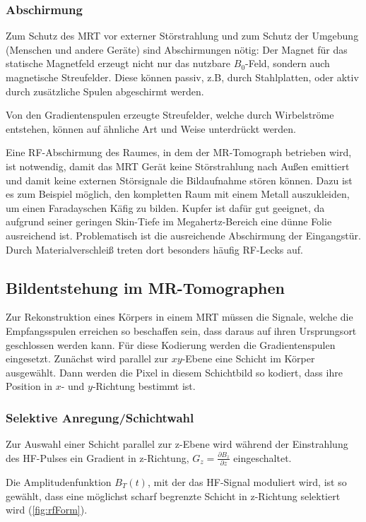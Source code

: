 \subsubsection{Abschirmung}
Zum Schutz des MRT vor externer Störstrahlung und zum Schutz der Umgebung (Menschen und andere Geräte) sind Abschirmungen nötig:
Der Magnet für das statische Magnetfeld erzeugt nicht nur das nutzbare $B_0$-Feld, sondern auch magnetische Streufelder. Diese können passiv, z.B, durch Stahlplatten, oder aktiv durch zusätzliche Spulen abgeschirmt werden.

Von den Gradientenspulen erzeugte Streufelder, welche durch Wirbelströme entstehen, können auf ähnliche Art und Weise unterdrückt werden.

Eine RF-Abschirmung des Raumes, in dem der MR-Tomograph betrieben wird, ist notwendig, damit das MRT Gerät keine Störstrahlung nach Außen emittiert und damit keine externen Störsignale die Bildaufnahme stören können.
Dazu ist es zum Beispiel möglich, den kompletten Raum mit einem Metall auszukleiden, um einen Faradayschen Käfig zu bilden. Kupfer ist dafür gut geeignet, da aufgrund seiner geringen Skin-Tiefe im Megahertz-Bereich eine dünne Folie ausreichend ist. \cite{Weibler1993} Problematisch ist die ausreichende Abschirmung der Eingangstür. Durch Materialverschleiß treten dort besonders häufig RF-Lecks auf.

\subsection{Bildentstehung im MR-Tomographen}
Zur Rekonstruktion eines Körpers in einem MRT müssen die Signale, welche die Empfangsspulen erreichen so beschaffen sein, dass daraus auf ihren Ursprungsort geschlossen werden kann. Für diese Kodierung werden die Gradientenspulen eingesetzt. Zunächst wird parallel zur $xy$-Ebene eine Schicht im Körper ausgewählt. Dann werden die Pixel in diesem Schichtbild so kodiert, dass ihre Position in $x$- und $y$-Richtung bestimmt ist.

\subsubsection{Selektive Anregung/Schichtwahl}
Zur Auswahl einer Schicht parallel zur z-Ebene wird während der Einstrahlung des HF-Pulses ein Gradient in z-Richtung, $G_z=\frac{\partial B_z}{\partial z}$ eingeschaltet.

Die Amplitudenfunktion $B_T(t)$, mit der das HF-Signal moduliert wird, ist so gewählt, dass eine möglichst scharf begrenzte Schicht in z-Richtung selektiert wird (\autoref{fig:rfForm}).

